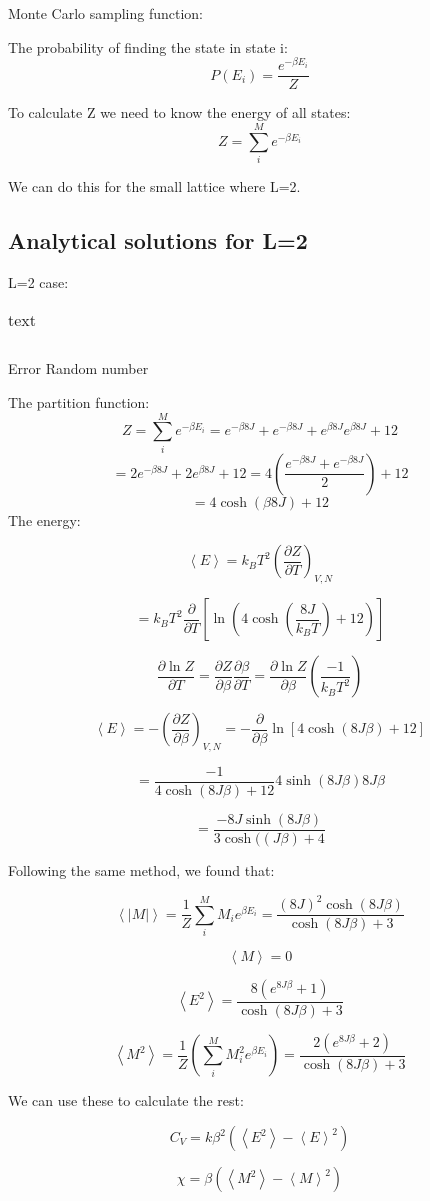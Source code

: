 Monte Carlo sampling function:

The probability of finding the state in state i:
\[
P(E_i) = \frac{e^{-\beta E_i}}{Z}
\]

To calculate Z we need to know the energy of all states:
\[
Z = \sum_i^M e^{-\beta E_i}
\]

We can do this for the small lattice where L=2.

\subsection{Analytical solutions for L=2}

L=2 case:
\begin{table}[H]
	\caption{text}
	\label{tab: makro}
\begin{tabular}{cccccc}
	
\end{tabular}
\end{table}

Error
Random number

The partition function:
\[
Z = \sum_i^M e^{-\beta E_i} = e^{-\beta 8 J} + e^{-\beta 8 J} + e^{\beta 8 J}e^{\beta 8 J} + 12
\]
\[
= 2e^{-\beta 8 J}+ 2e^{\beta 8 J} + 12 = 4\left(\frac{e^{-\beta 8 J}+ e^{-\beta 8 J}}{2}\right)+12
\]
\[
= 4 \cosh\left( \beta 8 J \right) + 12
\]
 The energy:

\[
\left< E \right> = k_B T^2 \left(\frac{\partial Z}{\partial T}
\right)_{V,N}
\]

\[
= k_B T^2 \frac{\partial}{\partial T} \left[\ln \left(4\cosh \left(\frac{8J}{k_BT}\right) +12\right) \right]\]

\[
\frac{\partial \ln Z}{\partial T} = \frac{\partial Z}{\partial \beta}\frac{\partial \beta}{\partial T} = \frac{\partial \ln Z}{\partial \beta}\left(\frac{-1}{k_B T^2}\right)
\]

\[
\left< E\right> = -\left(\frac{\partial Z}{\partial \beta} \right)_{V,N} = - \frac{\partial}{\partial \beta} \ln \left[ 4 \cosh \left( 8J\beta\right)+12\right]
\]

\[
= \frac{-1}{4\cosh (8J\beta) + 12}4 \sinh(8J\beta)8J\beta
\]

\[
= \frac{-8J \sinh(8J\beta)}{3\cosh((J\beta)+ 4}
\]

Following the same method, we found that:

\[
\left< |M| \right> = \frac{1}{Z} \sum_i^M M_i e^{\beta E_i}  = \frac{(8J)^2 \cosh(8J\beta )}{\cosh (8J\beta ) + 3}
\]

\[
\left< M \right> = 0
\]

\[
\left< E^2 \right> = \frac{8 \left( e^{8J\beta } + 1\right) }{\cosh (8J\beta ) + 3}
\]


\[
\left< M^2 \right> = \frac{1}{Z} \left( \sum_i^M M_i^2 e^{\beta E_i}\right) = \frac{2 \left( e^{8J\beta } + 2\right) }{\cosh (8J\beta ) + 3}
\]

We can use these to calculate the rest:

\[
C_V = k \beta^2\left( \left< E^2\right> - \left< E\right>^2 \right)
\]

\[
\chi = \beta \left( \left< M^2\right> - \left< M\right>^2\right)
\]